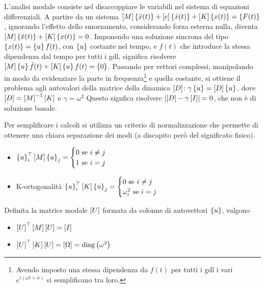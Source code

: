 L'analisi modale consiste nel disaccoppiare le variabili nel sistema di equazioni differenziali.
A partire da un sistema \(\left[M\right] \left\{ \Ddot{x}(t) \right\} + \left[ c \right] \left\{ \dot{x}(t) \right\} + \left[ K \right] \left\{ x(t) \right\} = \left\{ F(t) \right\}\), ignorando l'effetto dello smorzamento, considerando forza esterna nulla, diventa \(\left[M\right] \left\{ \Ddot{x}(t) \right\} + \left[ K \right] \left\{ x(t) \right\} = 0 \). 
Imponendo una soluzione sincrona del tipo \(\left\{ x(t) \right\} = \left\{ u \right\} f(t)\), con \(\left\{ u \right\}\) costante nel tempo, e \(f(t)\) che introduce la stessa dipendenza dal tempo per tutti i gdl, significa risolvere \(\left[M\right] \left\{ u \right\} \Ddot{f}(t) + \left[ K \right] \left\{ u \right\} f(t) = \left\{ 0 \right\}\).
Passando per vettori complessi, manipolando in modo da evidenziare la parte in frequenza\footnote{Avendo imposto una stessa dipendenza da \(f(t)\) per tutti i gdl i vari \(e^{i(\omega t +\phi)}\) si semplificano tra loro.} e quella costante, si ottiene il problema agli autovalori della matrice della dinamica \(\left[ D \right]\): \(\gamma \left\{ u \right\} = \left[ D \right] \left\{ u \right\} \), dove \(\left[ D \right] = \left[M\right]^{-1} \left[ K \right]\) e \(\gamma = \omega^2\)
Questo signfica risolvere \(\left|\left[ D \right] - \gamma \left[ I \right]\right| = 0\), che non è di soluzione banale.

Per semplificare i calcoli si utilizza un criterio di normalizzazione che permette di ottenere una chiara separazione dei modi (a discapito però del significato fisico).
\begin{itemize}
    \item \(\left\{ u \right\}_i^\top \left[M\right] \left\{ u \right\}_j = \begin{cases} 0 \text{  se } i\neq j \\ 1 \text{  se } i=j \end{cases} \) 
    \item K-ortogonalità \(\left\{ u \right\}_i^\top \left[ K \right] \left\{ u \right\}_j = \begin{cases} 0 \text{  se } i\neq j \\ \omega_i^2 \text{  se } i=j \end{cases} \) 
\end{itemize}

Definita la matrice modale \(\left[ U \right]\) formata da colonne di  autovettori \(\left\{ u \right\}\), valgono
\begin{itemize}
    \item \(\left[ U \right]^\top \left[M\right] \left[ U \right] = \left[ I \right] \)
    \item \(\left[ U \right]^\top \left[ K \right] \left[ U \right] = \left[ \Omega \right] =  \operatorname{diag}\left(\omega^2\right) \)
\end{itemize}

